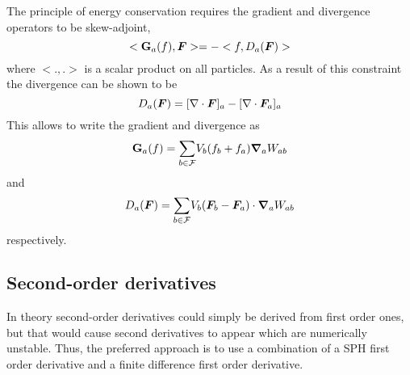 \documentclass{../GPUSPHtemplate}
\begin{document}
The principle of energy conservation requires the gradient and
divergence operators to be skew-adjoint, \ie
\begin{equation}
<\textbf{G}_a(f), \bm{F}> = - <f, D_a(\bm{F})>
\label{e:sph:skew-ajd}
\end{equation}
where $<.,.>$ is a scalar product on all particles. As a result of this
constraint the divergence can be shown to be
\begin{equation}
D_a(\bm{F}) = [\nabla \cdot \bm{F}]_a - [\nabla \cdot \bm{F}_a]_a
\label{e:sph:div-def}
\end{equation}
This allows to write the gradient and divergence as
\begin{equation}
\textbf{G}_a(f) = \underset{b \in \mathcal{F}}{\sum} V_b (f_b + f_a) \bm{\nabla}_a W_{ab}
\label{e:sph:grad}
\end{equation}
and
\begin{equation}
D_a(\bm{F}) = \underset{b \in \mathcal{F}}{\sum} V_b (\bm{F}_b - \bm{F}_a) \cdot \bm{\nabla}_a W_{ab}
\label{e:sph:div}
\end{equation}
respectively.


\subsection{Second-order derivatives}

In theory second-order derivatives could simply be derived from first
order ones, but that would cause second derivatives to appear which are
numerically unstable. Thus, the preferred approach is to use a
combination of a SPH first order derivative and a finite difference
first order derivative.
\end{document}
